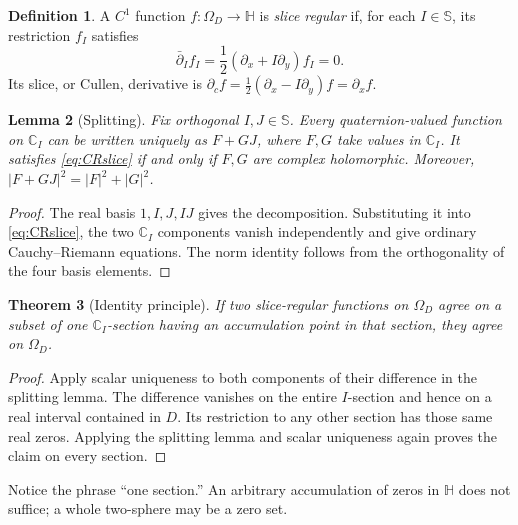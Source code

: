 \documentclass[11pt,a4paper]{article}
\numberwithin{equation}{section}
\newtheorem{theorem}{Theorem}[section]
\newtheorem{lemma}[theorem]{Lemma}
\theoremstyle{definition}
\newtheorem{definition}[theorem]{Definition}
\theoremstyle{remark}
\newcommand{\C}{\mathbb C}
\newcommand{\HH}{\mathbb H}
\newcommand{\SSS}{\mathbb S}
\newcommand{\pc}{\partial_c}
\begin{document}
\begin{definition}
A $C^1$ function $f:\Omega_D\to\HH$ is \emph{slice regular} if, for each
$I\in\SSS$, its restriction $f_I$ satisfies
\begin{equation}
 \bar\partial_I f_I
 =\frac12(\partial_x+I\partial_y)f_I=0.
 \label{eq:CRslice}
\end{equation}
Its slice, or Cullen, derivative is
$\pc f=\frac12(\partial_x-I\partial_y)f=\partial_x f$.
\end{definition}

\begin{lemma}[Splitting]
\label{lem:splitting}
Fix orthogonal $I,J\in\SSS$. Every quaternion-valued function on $\C_I$ can
be written uniquely as $F+GJ$, where $F,G$ take values in $\C_I$.
It satisfies \eqref{eq:CRslice} if and only if $F,G$ are complex holomorphic.
Moreover, $|F+GJ|^2=|F|^2+|G|^2$.
\end{lemma}
\begin{proof}
The real basis $1,I,J,IJ$ gives the decomposition. Substituting it into
\eqref{eq:CRslice}, the two $\C_I$ components vanish independently and give
ordinary Cauchy--Riemann equations. The norm identity follows from the
orthogonality of the four basis elements.
\end{proof}

\begin{theorem}[Identity principle]
\label{thm:identity}
If two slice-regular functions on $\Omega_D$ agree on a subset of one
$\C_I$-section having an accumulation point in that section, they agree on
$\Omega_D$.
\end{theorem}
\begin{proof}
Apply scalar uniqueness to both components of their difference in the splitting
lemma. The difference vanishes on the entire $I$-section and hence on a real
interval contained in $D$. Its restriction to any other section has those same
real zeros. Applying the splitting lemma and scalar uniqueness again proves
the claim on every section.
\end{proof}
Notice the phrase ``one section.'' An arbitrary accumulation of zeros in
$\HH$ does not suffice; a whole two-sphere may be a zero set.
\end{document}
